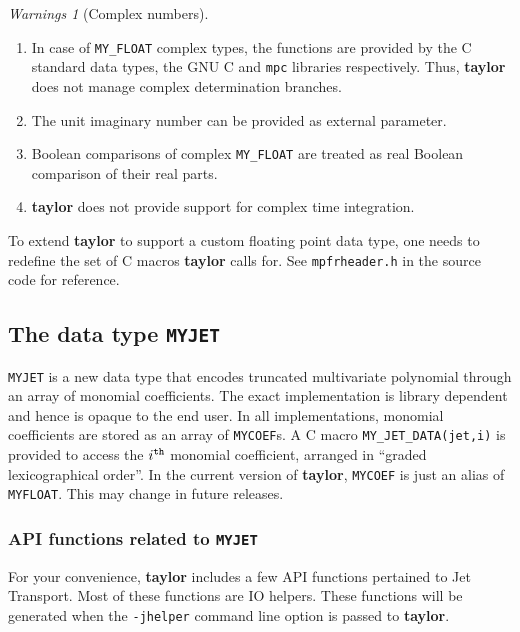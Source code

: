 \documentclass[10pt]{article}
\theoremstyle{remark}
\newtheorem*{warnings}{Warnings}
\newcommand{\taylorname}{{\bf taylor}}
\newcommand{\myfloat}{{\tt MY\symbol{95}FLOAT}}
\newcommand{\myjet}{{\tt MY\symbol{95}JET}}
\newcommand{\mycoef}{{\tt MY\symbol{95}COEF}}
\begin{document}
\begin{warnings}[Complex numbers]
 \begin{enumerate}
 \renewcommand{\theenumi}{\arabic{enumi}}
 \renewcommand{\labelenumi}{\theenumi.)}
     \item In case of \verb+MY_FLOAT+ complex types, the functions are
       provided by the C standard data types, the GNU C and \verb+mpc+
       libraries respectively. Thus, \taylorname{} does not manage
       complex determination branches.
     \item The unit imaginary number can be provided as external
       parameter.
     \item Boolean comparisons of complex \verb+MY_FLOAT+ are treated
       as real Boolean comparison of their real parts.
     \item \taylorname{} does not provide support for complex time
       integration.
 \end{enumerate}
\end{warnings}

\bigskip
To extend \taylorname{} to support a custom floating point data type,
one needs to redefine the set of C macros \taylorname{} calls for. See
{\tt{mpfrheader.h}} in the source code for reference.


\subsection{The data type \myjet{}} \label{sec:myjet}
\myjet{} is a new data type that encodes truncated multivariate
polynomial through an array of monomial coefficients. The exact
implementation is library dependent and hence is opaque to the end
user. In all implementations, monomial coefficients are stored as an
array of \mycoef{}s. A C macro \verb+MY_JET_DATA(jet,i)+ is provided
to access the $i^{{\tt th}}$ monomial coefficient, arranged in
``graded lexicographical order''.  In the current version of
\taylorname{}, \mycoef{} is just an alias of \myfloat{}. This may
change in future releases.

\subsubsection*{API functions related to \myjet{}} \label{sec:myjetapi}
For your convenience, \taylorname{} includes a few API functions
pertained to Jet Transport. Most of these functions are IO
helpers. These functions will be generated when the \verb+-jhelper+
command line option is passed to \taylorname{}.
\end{document}
